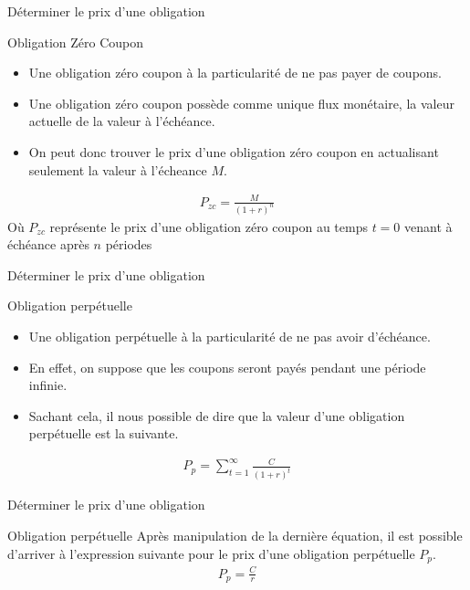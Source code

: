 \documentclass{beamer}
\begin{document}
\begin{frame}{Déterminer le prix d'une obligation}
\begin{block}{Obligation Zéro Coupon}
\begin{itemize}
\item Une obligation zéro coupon à la particularité de ne pas payer de coupons. 
\item Une obligation zéro coupon possède comme unique flux monétaire, la valeur actuelle de la valeur à l'échéance. 
\item On peut donc trouver le prix d'une obligation zéro coupon en actualisant seulement la valeur à l'écheance $M$. 
\end{itemize}
\begin{align*}
P_{zc}=\frac{M}{(1+r)^n}
\end{align*}
Où $P_{zc}$ représente le prix d'une obligation zéro coupon au temps $t=0$ venant à échéance après $n$ périodes 
\end{block}
\end{frame}


\begin{frame}{Déterminer le prix d'une obligation}
\begin{block}{Obligation perpétuelle}
\begin{itemize}
\item Une obligation perpétuelle à la particularité de ne pas avoir d'échéance. 
\item En effet, on suppose que les coupons seront payés pendant une période infinie. 
\item Sachant cela,  il nous possible de dire que la valeur d'une obligation perpétuelle est la suivante.
\end{itemize}
\begin{align*}
P_{p}=\sum_{t=1}^{\infty} \frac{C}{(1+r)^t}
\end{align*} 
\end{block}
\end{frame}


\begin{frame}{Déterminer le prix d'une obligation}
\begin{block}{Obligation perpétuelle}
Après manipulation de la dernière équation, il est possible d'arriver à l'expression suivante  pour le prix d'une obligation perpétuelle $P_p$.
\begin{align*}
P_p=\frac{C}{r}
\end{align*}
\end{block}
\end{frame}
\end{document}
